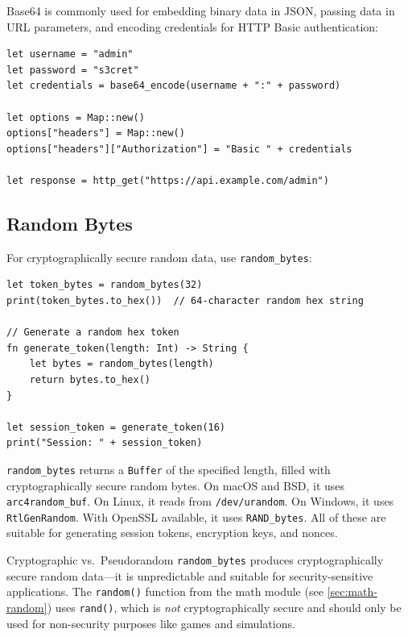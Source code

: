 Base64 is commonly used for embedding binary data in JSON, passing data in
URL parameters, and encoding credentials for HTTP Basic authentication:

\begin{lstlisting}[language=Lattice, caption={HTTP Basic authentication with Base64}]
let username = "admin"
let password = "s3cret"
let credentials = base64_encode(username + ":" + password)

let options = Map::new()
options["headers"] = Map::new()
options["headers"]["Authorization"] = "Basic " + credentials

let response = http_get("https://api.example.com/admin")
\end{lstlisting}

\subsection{Random Bytes}\label{sec:random-bytes}


For cryptographically secure random data, use \lstinline|random_bytes|:

\begin{lstlisting}[language=Lattice, caption={Generating random bytes}]
let token_bytes = random_bytes(32)
print(token_bytes.to_hex())  // 64-character random hex string

// Generate a random hex token
fn generate_token(length: Int) -> String {
    let bytes = random_bytes(length)
    return bytes.to_hex()
}

let session_token = generate_token(16)
print("Session: " + session_token)
\end{lstlisting}

\lstinline|random_bytes| returns a \lstinline|Buffer| of the specified
length, filled with cryptographically secure random bytes. On macOS and BSD,
it uses \texttt{arc4random\_buf}. On Linux, it reads from
\texttt{/dev/urandom}. On Windows, it uses \texttt{RtlGenRandom}. With
OpenSSL available, it uses \texttt{RAND\_bytes}. All of these are suitable
for generating session tokens, encryption keys, and nonces.

\begin{defnbox}{Cryptographic vs.\ Pseudorandom}
\lstinline|random_bytes| produces cryptographically secure random data---it
is unpredictable and suitable for security-sensitive applications. The
\lstinline|random()| function from the math module (see \cref{sec:math-random})
uses \texttt{rand()}, which is \emph{not} cryptographically secure and
should only be used for non-security purposes like games and simulations.
\end{defnbox}

